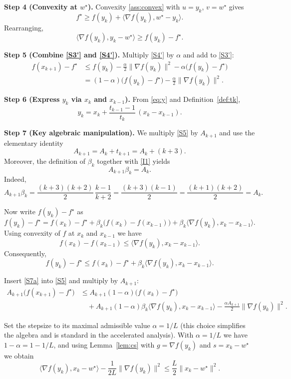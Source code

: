 \documentclass{article}
\newcommand{\grad}{\nabla}
\begin{document}
\noindent\textbf{Step 4 (Convexity at $w^\star$).}  
Convexity \eqref{ass:convex} with $u=y_k$, $v=w^\star$ gives
\[
f^\star\ge f(y_k)+\langle\grad f(y_k),w^\star-y_k\rangle .
\tag{S4}
\]
Rearranging,
\[
\langle\grad f(y_k),y_k-w^\star\rangle\ge f(y_k)-f^\star .
\tag{S4'}
\]

\noindent\textbf{Step 5 (Combine \eqref{S3'} and \eqref{S4'}).}  
Multiply \eqref{S4'} by $\alpha$ and add to \eqref{S3'}:
\[
\begin{aligned}
f(x_{k+1})-f^\star
&\le f(y_k)-\frac{\alpha}{2}\|\grad f(y_k)\|^2
      -\alpha\bigl(f(y_k)-f^\star\bigr)\\
&= (1-\alpha)\bigl(f(y_k)-f^\star\bigr)-\frac{\alpha}{2}\|\grad f(y_k)\|^2 .
\end{aligned}
\tag{S5}
\]

\noindent\textbf{Step 6 (Express $y_k$ via $x_k$ and $x_{k-1}$).}  
From \eqref{eq:y} and Definition~\ref{def:tk},
\[
y_k = x_k + \frac{t_{k-1}-1}{t_k}\,(x_k-x_{k-1}) .
\tag{S6}
\]

\noindent\textbf{Step 7 (Key algebraic manipulation).}  
We multiply \eqref{S5} by $A_{k+1}$ and use the elementary identity
\[
A_{k+1}=A_k + t_{k+1}=A_k + (k+3).
\tag{I1}
\]
Moreover, the definition of $\beta_k$ together with \eqref{I1} yields
\[
A_{k+1}\beta_k = A_k .
\tag{I2}
\]
Indeed,
\[
A_{k+1}\beta_k
= \frac{(k+3)(k+2)}{2}\,\frac{k-1}{k+2}
= \frac{(k+3)(k-1)}{2}
= \frac{(k+1)(k+2)}{2}=A_k .
\]

Now write $f(y_k)-f^\star$ as
\[
f(y_k)-f^\star
= f(x_k)-f^\star
   +\beta_k\bigl(f(x_k)-f(x_{k-1})\bigr)
   +\beta_k\langle\grad f(y_k),x_k-x_{k-1}\rangle .
\]
Using convexity of $f$ at $x_k$ and $x_{k-1}$ we have
\[
f(x_k)-f(x_{k-1})\le\langle\grad f(y_k),x_k-x_{k-1}\rangle .
\]
Consequently,
\[
f(y_k)-f^\star\le f(x_k)-f^\star
   +\beta_k\langle\grad f(y_k),x_k-x_{k-1}\rangle .
\tag{S7a}
\]

Insert \eqref{S7a} into \eqref{S5} and multiply by $A_{k+1}$:
\[
\begin{aligned}
A_{k+1}\bigl(f(x_{k+1})-f^\star\bigr)
&\le A_{k+1}(1-\alpha)\bigl(f(x_k)-f^\star\bigr) \\
&\quad +A_{k+1}(1-\alpha)\beta_k\langle\grad f(y_k),x_k-x_{k-1}\rangle
      -\frac{\alpha A_{k+1}}{2}\|\grad f(y_k)\|^2 .
\end{aligned}
\tag{S7b}
\]

Set the stepsize to its maximal admissible value $\alpha=1/L$ (this choice
simplifies the algebra and is standard in the accelerated analysis).  
With $\alpha=1/L$ we have $1-\alpha = 1-1/L$, and using Lemma~\ref{lem:cs}
with $g=\grad f(y_k)$ and $s= x_k-w^\star$ we obtain
\[
\langle\grad f(y_k),x_k-w^\star\rangle-\frac{1}{2L}\|\grad f(y_k)\|^2
\le \frac{L}{2}\|x_k-w^\star\|^2 .
\tag{S7c}
\]
\end{document}
